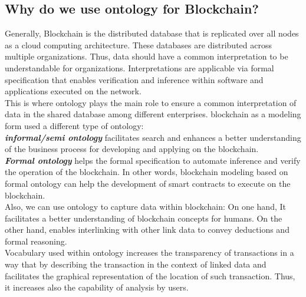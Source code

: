 \subsection{Why do we use ontology for Blockchain?}
Generally, Blockchain is the distributed database that is replicated over all nodes as a cloud computing architecture. These databases are distributed across multiple organizations. Thus, data should have a common interpretation to be understandable for organizations. Interpretations are applicable via formal specification that enables verification and inference within software and applications executed on the network. \\
This is where ontology plays the main role to ensure a common interpretation of data in the shared database among different enterprises.
blockchain as a modeling form used a different type of ontology: \\
\textbf{\textit{informal/semi ontology}} facilitates search and enhances a better understanding of the business process for developing and applying on the blockchain.\\
\textbf{\textit{Formal ontology}} helps the formal specification to automate inference and verify the operation of the blockchain. In other words, blockchain modeling based on formal ontology can help the development of smart contracts to execute on the blockchain.\\
Also, we can use ontology to capture data within blockchain: On one hand, It facilitates a better understanding of blockchain concepts for humans. On the other hand, enables interlinking with other link data to convey deductions and formal reasoning\cite{Kim}.\\
Vocabulary used within ontology increases the transparency of transactions in a way that by describing the transaction in the context of linked data and facilitates the graphical representation of the location of such transaction. Thus, it increases also the capability of analysis by users\cite{Kim}.

